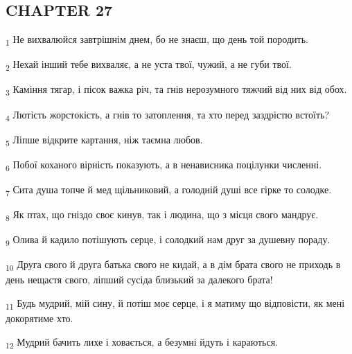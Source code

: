\subsection{CHAPTER 27}
\begin{tcolorbox}
\textsubscript{1} Не вихвалюйся завтрішнім днем, бо не знаєш, що день той породить.
\end{tcolorbox}
\begin{tcolorbox}
\textsubscript{2} Нехай інший тебе вихваляє, а не уста твої, чужий, а не губи твої.
\end{tcolorbox}
\begin{tcolorbox}
\textsubscript{3} Каміння тягар, і пісок важка річ, та гнів нерозумного тяжчий від них від обох.
\end{tcolorbox}
\begin{tcolorbox}
\textsubscript{4} Лютість жорстокість, а гнів то затоплення, та хто перед заздрістю встоїть?
\end{tcolorbox}
\begin{tcolorbox}
\textsubscript{5} Ліпше відкрите картання, ніж таємна любов.
\end{tcolorbox}
\begin{tcolorbox}
\textsubscript{6} Побої коханого вірність показують, а в ненависника поцілунки численні.
\end{tcolorbox}
\begin{tcolorbox}
\textsubscript{7} Сита душа топче й мед щільниковий, а голодній душі все гірке то солодке.
\end{tcolorbox}
\begin{tcolorbox}
\textsubscript{8} Як птах, що гніздо своє кинув, так і людина, що з місця свого мандрує.
\end{tcolorbox}
\begin{tcolorbox}
\textsubscript{9} Олива й кадило потішують серце, і солодкий нам друг за душевну пораду.
\end{tcolorbox}
\begin{tcolorbox}
\textsubscript{10} Друга свого й друга батька свого не кидай, а в дім брата свого не приходь в день нещастя свого, ліпший сусіда близький за далекого брата!
\end{tcolorbox}
\begin{tcolorbox}
\textsubscript{11} Будь мудрий, мій сину, й потіш моє серце, і я матиму що відповісти, як мені докорятиме хто.
\end{tcolorbox}
\begin{tcolorbox}
\textsubscript{12} Мудрий бачить лихе і ховається, а безумні йдуть і караються.
\end{tcolorbox}
